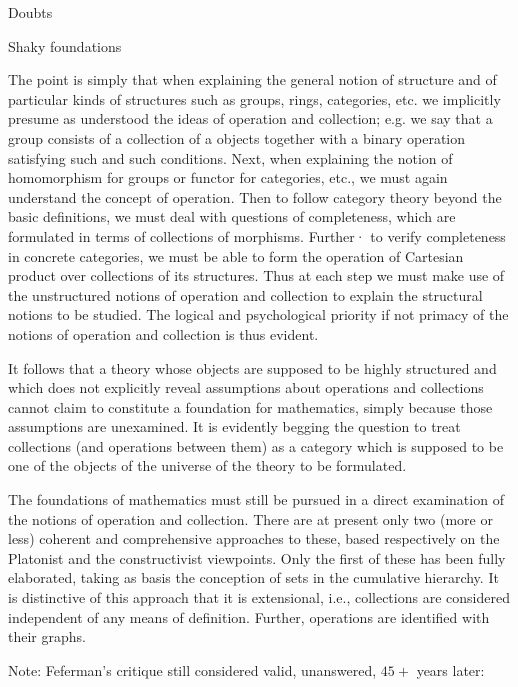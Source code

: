 \begin{plSection}{Doubts}
\begin{plSection}{Shaky foundations}
\begin{plQuote}
{}
{}
The point is simply that when explaining the general notion of
structure and of particular kinds of structures such as groups, rings,
categories, etc. we implicitly presume as understood the ideas of
operation and collection; e.g. we say that a group consists of a collection
of a objects together with a binary operation satisfying such and
such conditions. Next, when explaining the notion of homomorphism
for groups or functor for categories, etc., we must again understand the
concept of operation. Then to follow category theory beyond the basic
definitions, we must deal with questions of completeness, which are
formulated in terms of collections of morphisms. Further· to verify
completeness in concrete categories, we must be able to form the
operation of Cartesian product over collections of its structures. Thus
at each step we must make use of the unstructured notions of operation
and collection to explain the structural notions to be studied. The
logical and psychological priority if not primacy of the notions of
operation and collection is thus evident.
\par
It follows that a theory whose objects are supposed to be highly
structured and which does not explicitly reveal assumptions about
operations and collections cannot claim to constitute a foundation for
mathematics, simply because those assumptions are unexamined. It is
evidently begging the question to treat collections (and operations
between them) as a category which is supposed to be one of the objects
of the universe of the theory to be formulated.
\par
The foundations of mathematics must still be pursued in a direct
examination of the notions of operation and collection. There are at
present only two (more or less) coherent and comprehensive approaches
to these, based respectively on the Platonist and the constructivist
viewpoints. Only the first of these has been fully elaborated,
taking as basis the conception of sets in the cumulative hierarchy. It is
distinctive of this approach that it is extensional, i.e., collections are
considered independent of any means of definition. Further, operations
are identified with their graphs.
\end{plQuote}

Note: Feferman's critique still considered valid, unanswered,
$45+$ years later:


\end{plSection}
\end{plSection}
